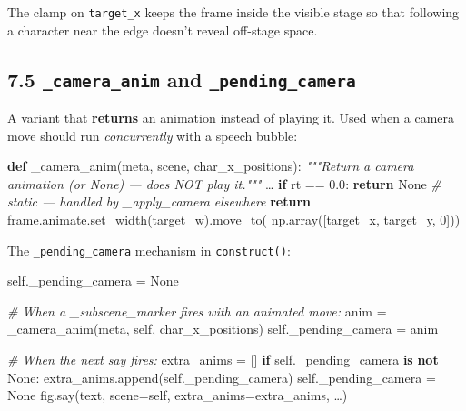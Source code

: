 \documentclass[
  11pt,
]{book}
\newenvironment{Shaded}{}{}
\newcommand{\CommentTok}[1]{\textcolor[rgb]{0.38,0.63,0.69}{\textit{#1}}}
\newcommand{\ControlFlowTok}[1]{\textcolor[rgb]{0.00,0.44,0.13}{\textbf{#1}}}
\newcommand{\DecValTok}[1]{\textcolor[rgb]{0.25,0.63,0.44}{#1}}
\newcommand{\FloatTok}[1]{\textcolor[rgb]{0.25,0.63,0.44}{#1}}
\newcommand{\KeywordTok}[1]{\textcolor[rgb]{0.00,0.44,0.13}{\textbf{#1}}}
\newcommand{\NormalTok}[1]{#1}
\newcommand{\OperatorTok}[1]{\textcolor[rgb]{0.40,0.40,0.40}{#1}}
\newcommand{\VariableTok}[1]{\textcolor[rgb]{0.10,0.09,0.49}{#1}}
\begin{document}
The clamp on \texttt{target\_x} keeps the frame inside the visible stage
so that following a character near the edge doesn't reveal off-stage
space.

\subsection{\texorpdfstring{7.5 \texttt{\_camera\_anim} and
\texttt{\_pending\_camera}}{7.5 \_camera\_anim and \_pending\_camera}}\label{camera_anim-and-_pending_camera}

A variant that \textbf{returns} an animation instead of playing it. Used
when a camera move should run \emph{concurrently} with a speech bubble:

\begin{Shaded}
\begin{Highlighting}[]
\KeywordTok{def}\NormalTok{ \_camera\_anim(meta, scene, char\_x\_positions):}
    \CommentTok{"""Return a camera animation (or None) — does NOT play it."""}
\NormalTok{    …}
    \ControlFlowTok{if}\NormalTok{ rt }\OperatorTok{==} \FloatTok{0.0}\NormalTok{:}
        \ControlFlowTok{return} \VariableTok{None}    \CommentTok{\# static — handled by \_apply\_camera elsewhere}
    \ControlFlowTok{return}\NormalTok{ frame.animate.set\_width(target\_w).move\_to(}
\NormalTok{        np.array([target\_x, target\_y, }\DecValTok{0}\NormalTok{]))}
\end{Highlighting}
\end{Shaded}

The \texttt{\_pending\_camera} mechanism in \texttt{construct()}:

\begin{Shaded}
\begin{Highlighting}[]
\VariableTok{self}\NormalTok{.\_pending\_camera }\OperatorTok{=} \VariableTok{None}

\CommentTok{\# When a \_subscene\_marker fires with an animated move:}
\NormalTok{anim }\OperatorTok{=}\NormalTok{ \_camera\_anim(meta, }\VariableTok{self}\NormalTok{, char\_x\_positions)}
\VariableTok{self}\NormalTok{.\_pending\_camera }\OperatorTok{=}\NormalTok{ anim}

\CommentTok{\# When the next \textasciigrave{}say\textasciigrave{} fires:}
\NormalTok{extra\_anims }\OperatorTok{=}\NormalTok{ []}
\ControlFlowTok{if} \VariableTok{self}\NormalTok{.\_pending\_camera }\KeywordTok{is} \KeywordTok{not} \VariableTok{None}\NormalTok{:}
\NormalTok{    extra\_anims.append(}\VariableTok{self}\NormalTok{.\_pending\_camera)}
    \VariableTok{self}\NormalTok{.\_pending\_camera }\OperatorTok{=} \VariableTok{None}
\NormalTok{fig.say(text, scene}\OperatorTok{=}\VariableTok{self}\NormalTok{, extra\_anims}\OperatorTok{=}\NormalTok{extra\_anims, …)}
\end{Highlighting}
\end{Shaded}
\end{document}
